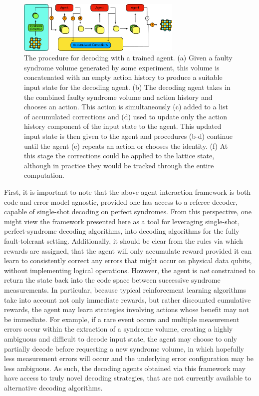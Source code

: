 \documentclass[twocolumn,preprintnumbers,amsmath,amssymb,notitlepage,nofootinbib,longbibliography,superscriptaddress,aps,pra,10pt]{revtex4-1}
\begin{document}
	\begin{figure}
	\centering
	\includegraphics[width=0.7\textwidth]{figures/agent_decoding.pdf}
	\caption{The procedure for decoding with a trained agent.
			(a) Given a faulty syndrome volume generated by some experiment, this volume is concatenated with an empty action history to produce a suitable input state for the decoding agent.
			(b) The decoding agent takes in the combined faulty syndrome volume and action history and chooses an action.
			This action is simultaneously (c) added to a list of accumulated corrections and (d) used to update only the action history component of the input state to the agent.
			This updated input state is then given to the agent and procedures (b-d) continue until the agent (e) repeats an action or chooses the identity.
			(f) At this stage the corrections could be applied to the lattice state, although in practice they would be tracked through the entire computation.
		}
		\label{agent_decoding}
	\end{figure}

	First, it is important to note that the above agent-interaction framework is both code and error model agnostic, provided one has access to a referee decoder, capable of single-shot decoding on perfect syndromes.
	From this perspective, one might view the framework presented here as a tool for leveraging single-shot, perfect-syndrome decoding algorithms, into decoding algorithms for the fully fault-tolerant setting.
	Additionally, it should be clear from the rules via which rewards are assigned, that the agent will only accumulate reward provided it can learn to consistently correct any errors that might occur on physical data qubits, without implementing logical operations.
	However, the agent is \textit{not} constrained to return the state back into the code space between successive syndrome measurements.
	In particular, because typical reinforcement learning algorithms take into account not only immediate rewards, but rather discounted cumulative rewards, the agent may learn strategies involving actions whose benefit may not be immediate.
	For example, if a rare event occurs and multiple measurement errors occur within the extraction of a syndrome volume, creating a highly ambiguous and difficult to decode input state, the agent may choose to only partially decode before requesting a new syndrome volume, in which hopefully less measurement errors will occur and the underlying error configuration may be less ambiguous.
	As such, the decoding agents obtained via this framework may have access to truly novel decoding strategies, that are not currently available to alternative decoding algorithms.
\end{document}
